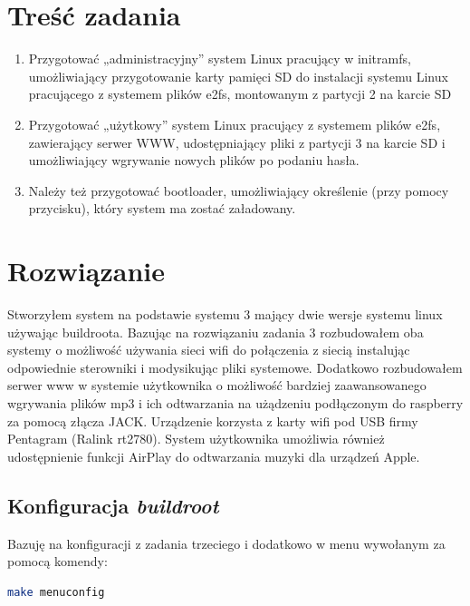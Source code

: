 
\usepackage{listings}
\usepackage{graphicx}


\maketitle
\tableofcontents
\newpage

\section{Treść zadania}
\begin{enumerate}
\item Przygotować „administracyjny” system Linux pracujący w 
initramfs, umożliwiający przygotowanie karty pamięci SD do 
instalacji systemu Linux pracującego z systemem plików 
e2fs, montowanym z partycji 2 na karcie SD
\item Przygotować „użytkowy” system Linux pracujący z 
systemem plików e2fs, zawierający serwer WWW, 
udostępniający pliki z partycji 3 na karcie SD i umożliwiający 
wgrywanie nowych plików po podaniu hasła.
\item Należy też przygotować bootloader, umożliwiający 
określenie (przy pomocy przycisku), który system ma zostać 
załadowany.
\end{enumerate}

\section{Rozwiązanie}
Stworzyłem system na podstawie systemu 3 mający dwie wersje systemu linux używając buildroota. 
Bazując na rozwiązaniu zadania 3 rozbudowałem oba systemy o możliwość używania sieci wifi do
połączenia z siecią instalując odpowiednie sterowniki i modysikując pliki systemowe. Dodatkowo
rozbudowałem serwer www w systemie użytkownika o możliwość bardziej zaawansowanego wgrywania
plików mp3 i ich odtwarzania na użądzeniu podłączonym do raspberry za pomocą złącza JACK.
Urządzenie korzysta z karty wifi pod USB firmy Pentagram (Ralink rt2780). System użytkownika
umożliwia również udostępnienie funkcji AirPlay do odtwarzania muzyki dla urządzeń Apple.

\subsection{Konfiguracja \emph{buildroot}}
Bazuję na konfiguracji z zadania trzeciego i dodatkowo w menu wywołanym za pomocą komendy:

\begin{lstlisting}[language=bash]
make menuconfig
\end{lstlisting}	

